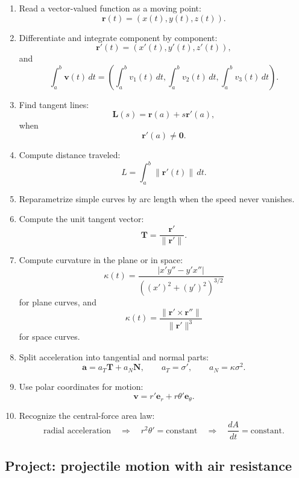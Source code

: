 \begin{enumerate}
\item Read a vector-valued function as a moving point:
\[
    \mathbf r(t)=(x(t),y(t),z(t)).
\]

\item Differentiate and integrate component by component:
\[
    \mathbf r'(t)=(x'(t),y'(t),z'(t)),
\]
and
\[
    \int_a^b \mathbf v(t)\,dt
    =
    \left(
    \int_a^b v_1(t)\,dt,\int_a^b v_2(t)\,dt,\int_a^b v_3(t)\,dt
    \right).
\]

\item Find tangent lines:
\[
    \mathbf L(s)=\mathbf r(a)+s\mathbf r'(a),
\]
when
\[
    \mathbf r'(a)\ne\mathbf 0.
\]

\item Compute distance traveled:
\[
    L=\int_a^b \|\mathbf r'(t)\|\,dt.
\]

\item Reparametrize simple curves by arc length when the speed never vanishes.

\item Compute the unit tangent vector:
\[
    \mathbf T=\frac{\mathbf r'}{\|\mathbf r'\|}.
\]

\item Compute curvature in the plane or in space:
\[
    \kappa(t)=
    \frac{|x'y''-y'x''|}
    {\left((x')^2+(y')^2\right)^{3/2}}
\]
for plane curves, and
\[
    \kappa(t)=
    \frac{\|\mathbf r'\times\mathbf r''\|}
    {\|\mathbf r'\|^3}
\]
for space curves.

\item Split acceleration into tangential and normal parts:
\[
    \mathbf a=a_T\mathbf T+a_N\mathbf N,
\qquad
    a_T=\sigma',
\qquad
    a_N=\kappa\sigma^2.
\]

\item Use polar coordinates for motion:
\[
    \mathbf v=r'\mathbf e_r+r\theta'\mathbf e_\theta.
\]

\item Recognize the central-force area law:
\[
    \text{radial acceleration}
    \quad\Longrightarrow\quad
    r^2\theta'=\text{constant}
    \quad\Longrightarrow\quad
    \frac{dA}{dt}=\text{constant}.
\]
\end{enumerate}

\subsection{Project: projectile motion with air resistance}

